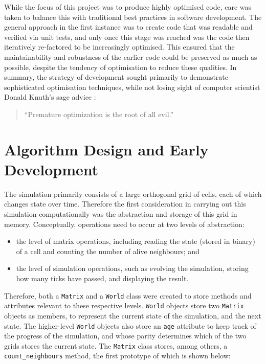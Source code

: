 \documentclass[12pt]{article}
\begin{document}
While the focus of this project was to produce highly optimised code,
care was taken to balance this with traditional best practices in software development.
The general approach in the first instance was to create code that was readable and verified via unit tests,
and only once this stage was reached was the code then iteratively re-factored to be increasingly optimised.
This ensured that the maintainability and robustness of the earlier code could be preserved as much as possible,
despite the tendency of optimisation to reduce these qualities.
In summary, the strategy of development sought primarily to demonstrate sophisticated optimisation techniques,
while not losing sight of computer scientist Donald Knuth's sage advice \cite{10.1145/356635.356640}:

\begin{quote}
    ``Premature optimization is the root of all evil.''
\end{quote}

\section*{Algorithm Design and Early Development}

The simulation primarily consists of a large orthogonal grid of cells, each of which changes state over time.
Therefore the first consideration in carrying out this simulation computationally was the abstraction and storage of this grid in memory.
Conceptually, operations need to occur at two levels of abstraction:
\begin{itemize}
    \item the level of matrix operations, including reading the state (stored in binary) of a cell and counting the number of alive neighbours; and
    \item the level of simulation operations, such as evolving the simulation, storing how many ticks have passed, and displaying the result.
\end{itemize}

Therefore, both a \texttt{Matrix} and a \texttt{World} class were created to store methods and attributes relevant to these respective levels.
\texttt{World} objects store two \texttt{Matrix} objects as members, to represent the current state of the simulation, and the next state.
The higher-level \texttt{World} objects also store an \texttt{age} attribute to keep track of the progress of the simulation,
and whose parity determines which of the two grids stores the current state.
The \texttt{Matrix} class stores, among others, a \texttt{count\_neighbours} method,
the first prototype of which is shown below:
\end{document}
